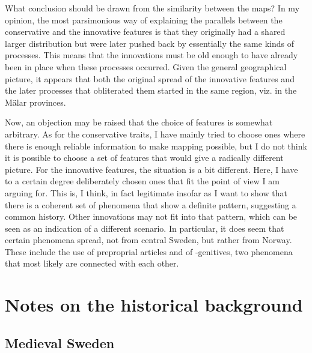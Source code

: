 What conclusion should be drawn from the similarity between the maps? In my opinion, the most parsimonious way of explaining the parallels between the conservative and the innovative features is that they originally had a shared larger distribution but were later pushed back by essentially the same kinds of processes. This means that the innovations must be old enough to have already been in place when these processes occurred. Given the general geographical picture, it appears that both the original spread of the innovative features and the later processes that obliterated them started in the same region, viz. in the Mälar provinces. 




Now, an objection may be raised that the choice of features is somewhat arbitrary. As for the conservative traits, I have mainly tried to choose ones where there is enough reliable information to make mapping possible, but I do not think it is possible to choose a set of features that would give a radically different picture. For the innovative features, the situation is a bit different. Here, I have to a certain degree deliberately chosen ones that fit the point of view I am arguing for. This is, I think, in fact legitimate insofar as I want to show that there is a coherent set of phenomena that show a definite pattern, suggesting a common history. Other innovations may not fit into that pattern, which can be seen as an indication of a different scenario. In particular, it does seem that certain phenomena spread, not from central Sweden, but rather from Norway. These include the use of preproprial articles and of -genitives, two phenomena that most likely are connected with each other. 



\section{Notes on the historical background}
\subsection{Medieval Sweden}

